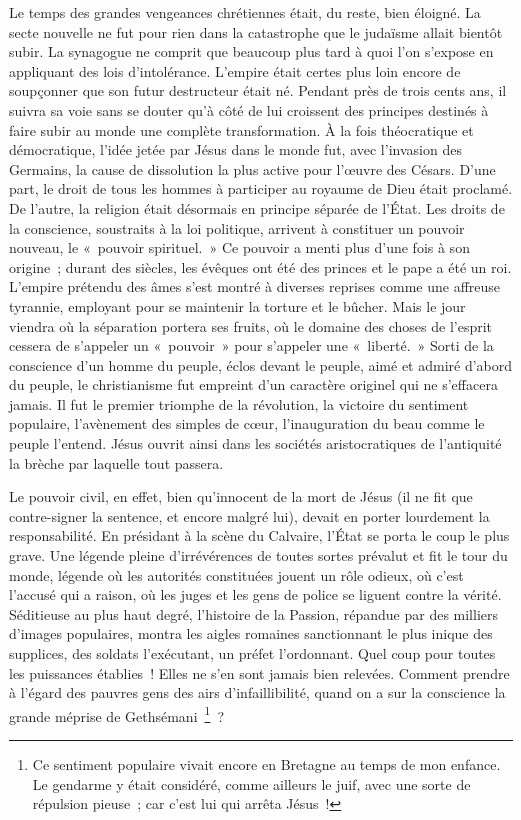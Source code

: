 \documentclass[french,twoside]{book} %
\newcommand\chapterclose{} %
\begin{document}
Le temps des grandes vengeances chrétiennes était, du reste, bien éloigné. La secte nouvelle ne fut pour rien dans la catastrophe que le judaïsme allait bientôt subir. La synagogue ne comprit que beaucoup plus tard à quoi l’on s’expose en appliquant des lois d’intolérance. L’empire était certes plus loin encore de soupçonner que son futur destructeur était né. Pendant près de trois cents ans, il suivra sa voie sans se douter qu’à côté de lui croissent des principes destinés à faire subir au monde une complète transformation. À la fois théocratique et démocratique, l’idée jetée par Jésus dans le monde fut, avec l’invasion des Germains, la cause de dissolution la plus active pour l’œuvre des Césars. D’une part, le droit de tous les hommes à participer au royaume de Dieu était proclamé. De l’autre, la religion était désormais en principe séparée de l’État. Les droits de la conscience, soustraits à la loi politique, arrivent à constituer un pouvoir nouveau, le « pouvoir spirituel. » Ce pouvoir a menti plus d’une fois à son origine ; durant des siècles, les évêques ont été des princes et le pape a été un roi. L’empire prétendu des âmes s’est montré à diverses reprises comme une affreuse tyrannie, employant pour se maintenir la torture et le bûcher. Mais le jour viendra où la séparation portera ses fruits, où le domaine des choses de l’esprit cessera de s’appeler un « pouvoir » pour s’appeler une « liberté. » Sorti de la conscience d’un homme du peuple, éclos devant le peuple, aimé et admiré d’abord du peuple, le christianisme fut empreint d’un caractère originel qui ne s’effacera jamais. Il fut le premier triomphe de la révolution, la victoire du sentiment populaire, l’avènement des simples de cœur, l’inauguration du beau comme le peuple l’entend. Jésus ouvrit ainsi dans les sociétés aristocratiques de l’antiquité la brèche par laquelle tout passera.\par
Le pouvoir civil, en effet, bien qu’innocent de la mort de Jésus (il ne fit que contre-signer la sentence, et encore malgré lui), devait en porter lourdement la responsabilité. En présidant à la scène du Calvaire, l’État se porta le coup le plus grave. Une légende pleine d’irrévérences de toutes sortes prévalut et fit le tour du monde, légende où les autorités constituées jouent un rôle odieux, où c’est l’accusé qui a raison, où les juges et les gens de police se liguent contre la vérité. Séditieuse au plus haut degré, l’histoire de la Passion, répandue par des milliers d’images populaires, montra les aigles romaines sanctionnant le plus inique des supplices, des soldats l’exécutant, un préfet l’ordonnant. Quel coup pour toutes les puissances établies ! Elles ne s’en sont jamais bien relevées. Comment prendre à l’égard des pauvres gens des airs d’infaillibilité, quand on a sur la conscience la grande méprise de Gethsémani \footnote{Ce sentiment populaire vivait encore en Bretagne au temps de mon enfance. Le gendarme y était considéré, comme ailleurs le juif, avec une sorte de répulsion pieuse ; car c’est lui qui arrêta Jésus !} ?
\chapterclose
\end{document}
